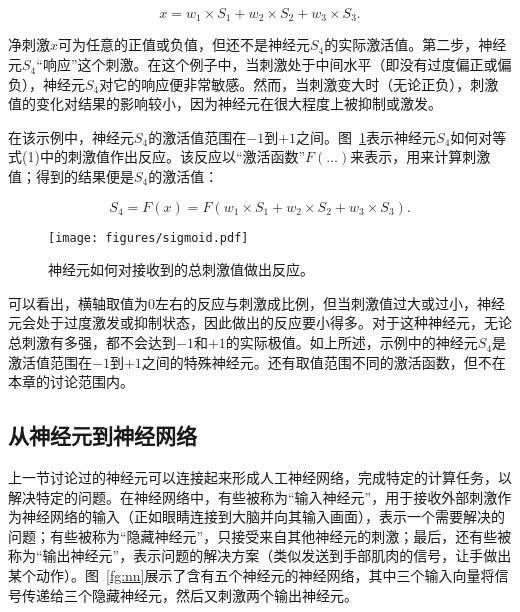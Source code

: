 \documentclass[output=paper,colorlinks,citecolor=brown]{langscibook}
\begin{document}
\begin{equation}
    x = w_1\times S_1 + w_2\times S_2 + w_3\times S_3.
    \label{eq:stimulus}
\end{equation}

净刺激$x$可为任意的正值或负值，但还不是神经元$S_4$的实际激活值。第二步，神经元$S_4$“响应”这个刺激。在这个例子中，当刺激处于中间水平（即没有过度偏正或偏负），神经元$S_4$对它的响应便非常敏感。然而，当刺激变大时（无论正负），刺激值的变化对结果的影响较小，因为神经元在很大程度上被抑制或激发。

在该示例中，神经元$S_4$的激活值范围在$-1$到$+1$之间。图~\ref{fg:sigmoid}表示神经元$S_4$如何对等式(1)中的刺激值作出反应。该反应以“激活函数”$F(\ldots)$来表示，用来计算刺激值；得到的结果便是$S_4$的激活值：

\begin{equation}
    S_4=F(x)=F(w_1\times S_1 + w_2\times S_2 + w_3\times S_3).
\end{equation}

\begin{figure}
    \texttt{[image: figures/sigmoid.pdf]}
    \caption{神经元如何对接收到的总刺激值做出反应。}
    \label{fg:sigmoid}
\end{figure}

可以看出，横轴取值为$0$左右的反应与刺激成比例，但当刺激值过大或过小，神经元会处于过度激发或抑制状态，因此做出的反应要小得多。对于这种神经元，无论总刺激有多强，都不会达到$-1$和$+1$的实际极值。如上所述，示例中的神经元$S_4$是激活值范围在$-1$到$+1$之间的特殊神经元。还有取值范围不同的激活函数，但不在本章的讨论范围内。


\subsection{从神经元到神经网络}
\label{ss:ann}

上一节讨论过的神经元可以连接起来形成人工神经网络，完成特定的计算任务，以解决特定的问题。在神经网络中，有些被称为“输入神经元”，用于接收外部刺激作为神经网络的输入（正如眼睛连接到大脑并向其输入画面），表示一个需要解决的问题；有些被称为“隐藏神经元”，只接受来自其他神经元的刺激；最后，还有些被称为“输出神经元”，表示问题的解决方案（类似发送到手部肌肉的信号，让手做出某个动作）。图~\ref{fg:nn}展示了含有五个神经元的神经网络，其中三个输入向量将信号传递给三个隐藏神经元，然后又刺激两个输出神经元。
\end{document}
